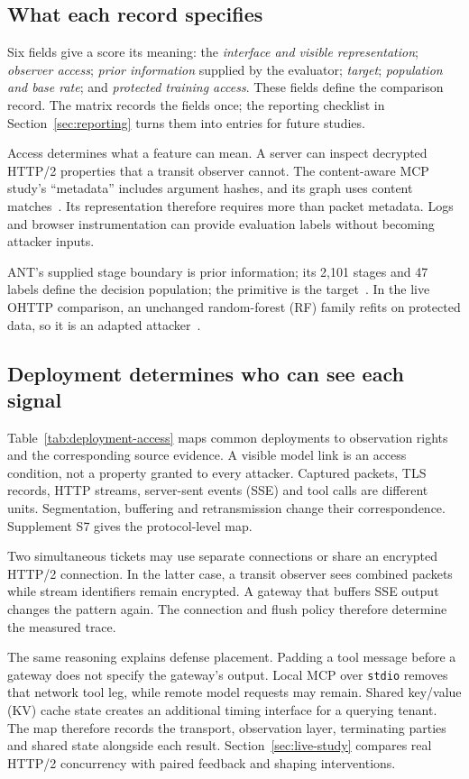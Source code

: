 \subsection{What each record specifies}
Six fields give a score its meaning: the \emph{interface and visible representation}; \emph{observer access}; \emph{prior information} supplied by the evaluator; \emph{target}; \emph{population and base rate}; and \emph{protected training access}. These fields define the comparison record. The matrix records the fields once; the reporting checklist in Section~\ref{sec:reporting} turns them into entries for future studies.

Access determines what a feature can mean. A server can inspect decrypted HTTP/2 properties that a transit observer cannot. The content-aware MCP study's ``metadata'' includes argument hashes, and its graph uses content matches~\cite[Secs.~4.1--4.2]{zavrak2026content}. Its representation therefore requires more than packet metadata. Logs and browser instrumentation can provide evaluation labels without becoming attacker inputs.

ANT's supplied stage boundary is prior information; its 2,101 stages and 47 labels define the decision population; the primitive is the target~\cite{li2026ant}. In the live OHTTP comparison, an unchanged random-forest (RF) family refits on protected data, so it is an adapted attacker~\cite{dangol2026workflow}.

\subsection{Deployment determines who can see each signal}
Table~\ref{tab:deployment-access} maps common deployments to observation rights and the corresponding source evidence. A visible model link is an access condition, not a property granted to every attacker. Captured packets, TLS records, HTTP streams, server-sent events (SSE) and tool calls are different units. Segmentation, buffering and retransmission change their correspondence. Supplement S7 gives the protocol-level map.

Two simultaneous tickets may use separate connections or share an encrypted HTTP/2 connection. In the latter case, a transit observer sees combined packets while stream identifiers remain encrypted. A gateway that buffers SSE output changes the pattern again. The connection and flush policy therefore determine the measured trace.



The same reasoning explains defense placement. Padding a tool message before a gateway does not specify the gateway's output. Local MCP over \texttt{stdio} removes that network tool leg, while remote model requests may remain. Shared key/value (KV) cache state creates an additional timing interface for a querying tenant. The map therefore records the transport, observation layer, terminating parties and shared state alongside each result. Section~\ref{sec:live-study} compares real HTTP/2 concurrency with paired feedback and shaping interventions.

